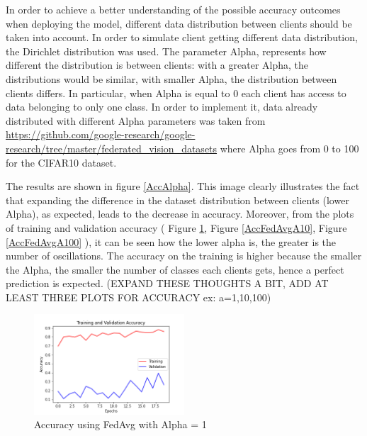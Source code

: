 \documentclass[twocolumn]{article}
\begin{document}
In order to achieve a better understanding of the possible accuracy outcomes when deploying the model, different data distribution between clients should be taken into account. In order to simulate client getting different data distribution, the Dirichlet distribution was used. The parameter Alpha, represents how different the distribution is between clients: with a greater Alpha, the distributions 
would be similar, with smaller Alpha, the distribution between clients differs.
In particular, when Alpha is equal to 0 each client has access to data belonging to only one class.
In order to implement it, data already distributed with different Alpha parameters was taken from \url{https://github.com/google-research/google-research/tree/master/federated_vision_datasets} where Alpha goes from 0 to 100 for the CIFAR10 dataset.



The results are shown in figure \ref{AccAlpha}. This image clearly illustrates the fact that expanding the difference in the dataset distribution between clients (lower Alpha), as expected, leads to the decrease in accuracy. 
Moreover, from the plots of training and validation accuracy ( Figure \ref{AccFedAvgA1}, Figure \ref{AccFedAvgA10}, Figure \ref{AccFedAvgA100} ), it can be seen how the lower alpha is, the greater is the number of oscillations.
The accuracy on the training is higher because the smaller the Alpha, the smaller the number of classes each clients gets, hence a perfect prediction is expected. 
(EXPAND THESE THOUGHTS A BIT, ADD AT LEAST THREE PLOTS FOR ACCURACY ex: a=1,10,100)

\begin{figure}
    \centering
    \includegraphics[width=0.5\textwidth,height=.3\textheight]{2_AccuracyFedAvg_A1.png}
    \caption{Accuracy using FedAvg with Alpha = 1}
     \label{AccFedAvgA1} 
\end{figure}
\end{document}
